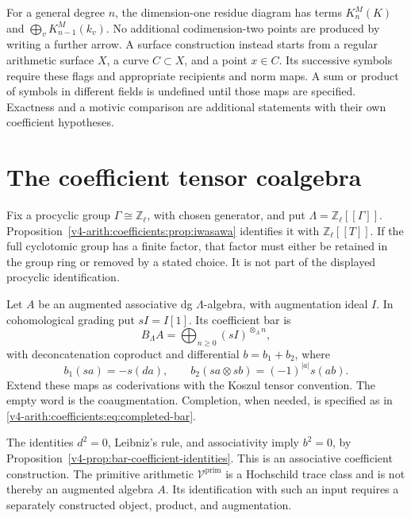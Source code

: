 For a general degree \(n\), the dimension-one residue diagram has
terms \(K^M_n(K)\) and
\(\bigoplus_vK^M_{n-1}(k_v)\). No additional codimension-two
points are produced by writing a further arrow. A surface construction
instead starts from a regular arithmetic surface \(X\), a curve
\(C\subset X\), and a point \(x\in C\). Its successive symbols
require these flags and appropriate recipients and norm maps.
A sum or product of symbols in different fields is undefined until
those maps are specified. Exactness and a motivic comparison are
additional statements with their own coefficient hypotheses.

\section{The coefficient tensor coalgebra}
\label{v4-arith:bar:tensor-coalgebra}

Fix a procyclic group \(\Gamma\cong\mathbb Z_\ell\), with chosen
generator, and put \(\Lambda=\mathbb Z_\ell[[\Gamma]]\).
Proposition~\ref{v4-arith:coefficients:prop:iwasawa} identifies it
with \(\mathbb Z_\ell[[T]]\). If the full cyclotomic group has a
finite factor, that factor must either be retained in the group ring
or removed by a stated choice. It is not part of the displayed
procyclic identification.

\begin{definition}
\label{v4-arith:def:lambda-tensor-coalgebra}
Let \(A\) be an augmented associative dg \(\Lambda\)-algebra, with
augmentation ideal \(I\). In cohomological grading put \(sI=I[1]\).
Its coefficient bar is
\[
 B_\Lambda A=\bigoplus_{n\geq0}(sI)^{\otimes_\Lambda n},
\]
with deconcatenation coproduct and differential \(b=b_1+b_2\), where
\[
 b_1(sa)=-s(da),\qquad
 b_2(sa\otimes sb)=(-1)^{|a|}s(ab).
\]
Extend these maps as coderivations with the Koszul tensor convention.
The empty word is the coaugmentation. Completion, when needed, is
specified as in \eqref{v4-arith:coefficients:eq:completed-bar}.
\end{definition}

The identities \(d^2=0\), Leibniz's rule, and associativity imply
\(b^2=0\), by
Proposition~\ref{v4-prop:bar-coefficient-identities}. This is an
associative coefficient construction. The primitive arithmetic
\(\mathcal V^{\mathrm{prim}}\) is a Hochschild trace class and is
not thereby an augmented algebra \(A\). Its identification with
such an input requires a separately constructed object, product,
and augmentation.

